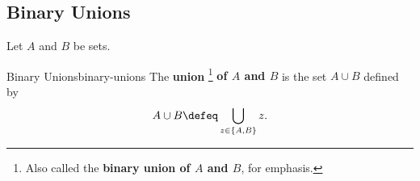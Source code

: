 \subsection{Binary Unions}\label{subsection-binary-unions}
Let $A$ and $B$ be sets.%
\begin{definition}{Binary Unions}{binary-unions}%
    The \textbf{union}%
    \footnote{%
        Also called the \textbf{binary union of $A$ and $B$}, for emphasis.
        \par\vspace*{-1.75\baselineskip}
    } %
    \textbf{of $A$ and $B$} is the set $A\cup B$ defined by
    \[
        A\cup B
        \defeq
        \bigcup_{z\in\{A,B\}}z.
    \]%
\end{definition}

